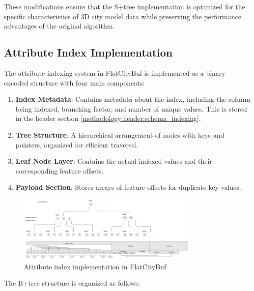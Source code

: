 These modifications ensure that the S+tree implementation is optimized for the specific characteristics of 3D city model data while preserving the performance advantages of the original algorithm.

\subsection{Attribute Index Implementation}
\label{methodology:attribute_index:implementation}

The attribute indexing system in FlatCityBuf is implemented as a binary encoded structure with four main components:

\begin{enumerate}
    \item \textbf{Index Metadata}: Contains metadata about the index, including the column being indexed, branching factor, and number of unique values. This is stored in the header section \autoref{methodology:header:schema_indexing}.
    \item \textbf{Tree Structure}: A hierarchical arrangement of nodes with keys and pointers, organized for efficient traversal.
    \item \textbf{Leaf Node Layer}: Contains the actual indexed values and their corresponding feature offsets.
    \item \textbf{Payload Section}: Stores arrays of feature offsets for duplicate key values.
\end{enumerate}

\begin{figure}[h]
  \centering
  \includegraphics[width=0.8\textwidth]{figs/methodology/attribute_index.png}
  \caption{Attribute index implementation in FlatCityBuf}
  \label{fig:methodology:attribute_index}
\end{figure}

The B+tree structure is organized as follows:

